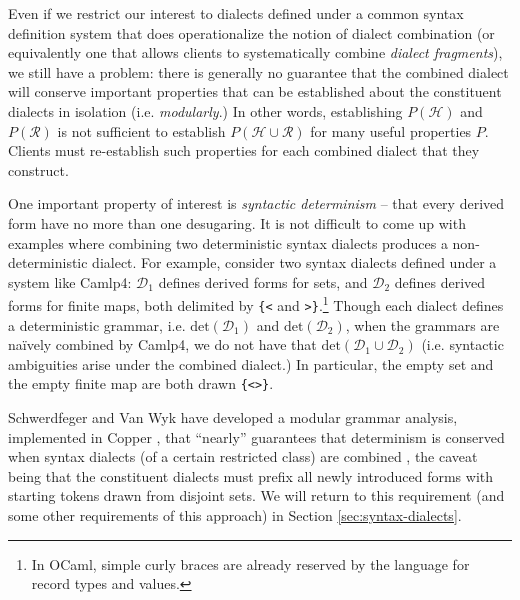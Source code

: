 Even if we restrict our interest  to dialects defined under a common syntax definition system that does operationalize the notion of dialect combination (or equivalently one that allows clients to systematically combine \emph{dialect fragments}), we still have a problem: there is generally no guarantee that the combined dialect will conserve important properties that can be established about the constituent dialects in isolation (i.e. \emph{modularly}.) In other words, establishing $P(\mathcal{H})$ and $P(\mathcal{R})$ is not sufficient to establish $P(\mathcal{H} \cup \mathcal{R})$ for many useful properties $P$. Clients must re-establish such properties for each combined dialect that they construct.%

One important property of interest is \emph{syntactic determinism} -- that every derived form have no more than one desugaring. It is not difficult to come up with examples where combining two deterministic syntax dialects produces a non-deterministic dialect. For example, consider two syntax dialects defined under a system like Camlp4: $\mathcal{D}_1$ defines derived forms for sets, and $\mathcal{D}_2$ defines derived forms for finite maps, both delimited by \verb~{<~ and \verb~>}~.\footnote{In OCaml, simple curly braces are already reserved by the language for record types and values.} Though each dialect defines a deterministic grammar, i.e. $\mathrm{det}(\mathcal{D}_1)$ and $\mathrm{det}(\mathcal{D}_2)$, when the grammars are na\"ively combined by Camlp4, we do not have that $\mathrm{det}(\mathcal{D}_1 \cup \mathcal{D}_2)$ (i.e. syntactic ambiguities arise under the combined dialect.) In particular, the empty set and the empty finite map are both drawn \verb~{<>}~. %

Schwerdfeger and Van Wyk have developed a modular grammar analysis, implemented in Copper \cite{conf/gpce/WykS07}, that ``nearly'' guarantees that determinism is conserved when syntax dialects (of a certain restricted class) are combined \cite{conf/pldi/SchwerdfegerW09}, the caveat being that the constituent dialects must prefix all newly introduced forms with starting tokens drawn from disjoint sets. We will return to this requirement (and some other requirements of this approach) in Section \ref{sec:syntax-dialects}.


